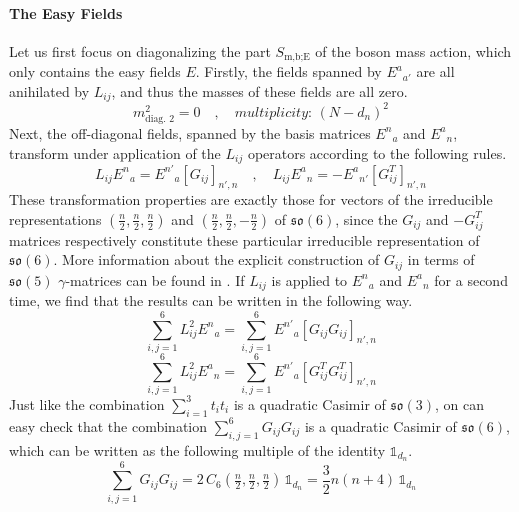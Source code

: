 \paragraph{The Easy Fields}
Let us first focus on diagonalizing the part $S_{\text{m,b;E}}$ of the boson mass action, which only contains the easy fields $E$. Firstly, the fields spanned by ${E^{a}}_{a'}$ are all anihilated by $L_{ij}$, and thus the masses of these fields are all zero.
%
%
\begin{equation}
m^2_{\text{diag. 2}} = 0
%
\quad , \quad
%
\textit{multiplicity: } (N - d_n)^2
\end{equation}
%
%
Next, the off-diagonal fields, spanned by the basis matrices ${E^{n}}_{a}$ and ${E^{a}}_{n}$, transform under application of the $L_{ij}$ operators according to the following rules.
%
%
\begin{equation}
L_{ij} {E^n}_a = {E^{n'}}_a [G_{ij}]_{n',n}
%
\quad , \quad
%
L_{ij} {E^a}_n = -{E^a}_{n'} [G_{ij}^T]_{n',n}
\end{equation}
%
%
These transformation properties are exactly those for vectors of the irreducible representations $(\tfrac{n}{2},\tfrac{n}{2},\tfrac{n}{2})$ and $(\tfrac{n}{2},\tfrac{n}{2},-\tfrac{n}{2})$ of $\mathfrak{so}(6)$, since the $G_{ij}$ and $-G^T_{ij}$ matrices respectively constitute these particular irreducible representation of $\mathfrak{so}(6)$. More information about the explicit construction of $G_{ij}$ in terms of $\mathfrak{so}(5)$ $\gamma$-matrices can be found in \cite{Grau Volk thesis, MPS bethe state overlap SO(5)}. If $L_{ij}$ is applied to ${E^{n}}_{a}$ and ${E^{a}}_{n}$ for a second time, we find that the results can be written in the following way.
%
%
\begin{equation}
\sum_{i,j=1}^6 L^2_{ij} {E^n}_a = \sum_{i,j=1}^6 {E^{n'}}_a [G_{ij} G_{ij}]_{n',n}
\end{equation}
%
%
\begin{equation}
\sum_{i,j=1}^6 L^2_{ij} {E^a}_n = \sum_{i,j=1}^6 {E^{n'}}_a [G^T_{ij} G^T_{ij}]_{n',n}
\end{equation}
%
%
Just like the combination $\sum_{i=1}^3 t_i t_i$ is a quadratic Casimir of $\mathfrak{so}(3)$, on can easy check that the combination $\sum_{i,j=1}^6 G_{ij} G_{ij}$ is a quadratic Casimir of $\mathfrak{so}(6)$, which can be written as the following multiple of the identity $\mathbb{1}_{d_n}$.
%
%
\begin{equation}
\sum_{i,j=1}^6 G_{ij} G_{ij}
=
2 \, C_6(\tfrac{n}{2},\tfrac{n}{2},\tfrac{n}{2}) \, \mathbb{1}_{d_n}
=
\frac{3}{2} n (n + 4) \, \mathbb{1}_{d_n}
\end{equation}
